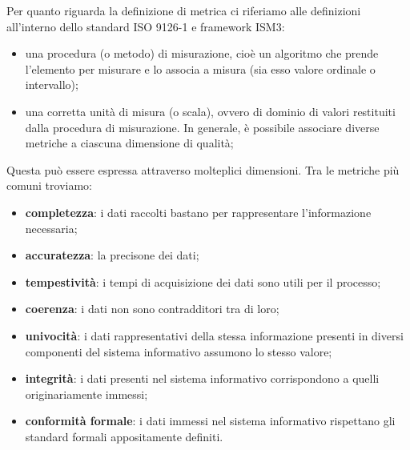 \documentclass[a4paper,12pt]{article}
\begin{document}
\noindent Per quanto riguarda la definizione di metrica ci riferiamo alle definizioni all'interno dello standard ISO 9126-1 e framework ISM3:
\begin{itemize}
	\item una procedura (o metodo) di misurazione, cioè un algoritmo che prende l'elemento per misurare e lo associa a misura (sia esso valore ordinale o intervallo); 
	\item una corretta unità di misura (o scala), ovvero di dominio di valori restituiti dalla procedura di misurazione. In generale, è possibile associare diverse metriche a ciascuna dimensione di qualità;
\end{itemize} 
Questa può essere espressa attraverso molteplici dimensioni. Tra le metriche più comuni troviamo:

\begin{itemize}
\item \textbf{completezza}: i dati raccolti bastano per rappresentare l'informazione necessaria; 
\item \textbf{accuratezza}: la precisone dei dati;
\item \textbf{tempestività}: i tempi di acquisizione dei dati sono utili per il processo;
\item \textbf{coerenza}: i dati non sono contradditori tra di loro;
\item \textbf{univocità}: i dati rappresentativi della stessa informazione presenti in diversi componenti del sistema informativo assumono lo stesso valore;
\item \textbf{integrità}: i dati presenti nel sistema informativo corrispondono a quelli originariamente immessi;
\item \textbf{conformità formale}: i dati immessi nel sistema informativo rispettano gli standard formali appositamente definiti.
\end{itemize} 

\bigskip
\end{document}
